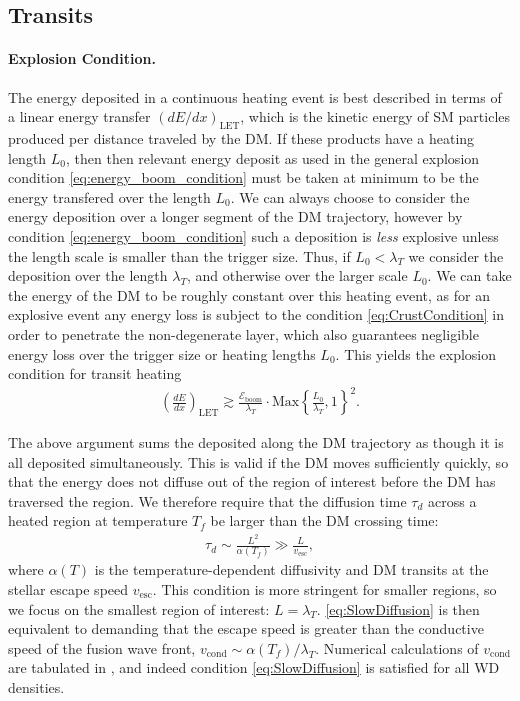 \documentclass[twocolumn, preprintnumbers,amsmath,amssymb,prd, superscriptaddress]{revtex4}
\newcommand{\Eboom}{\mathcal{E}_\text{boom}}
\begin{document}
\subsection{Transits}

\paragraph{Explosion Condition.}
The energy deposited in a continuous heating event is best described in terms of a linear energy transfer $(dE/dx)_\text{LET}$, which is the kinetic energy of SM particles produced per distance traveled by the DM.
If these products have a heating length $L_0$, then then relevant energy deposit as used in the general explosion condition \eqref{eq:energy_boom_condition} must be taken at minimum to be the energy transfered over the length $L_0$.
We can always choose to consider the energy deposition over a longer segment of the DM trajectory, however by condition \eqref{eq:energy_boom_condition} such a deposition is \emph{less} explosive unless the length scale is smaller than the trigger size.
Thus, if $L_0 < \lambda_T$ we consider the deposition over the length $\lambda_T$, and otherwise over the larger scale $L_0$.
We can take the energy of the DM to be roughly constant over this heating event, as for an explosive event any energy loss is subject to the condition
\eqref{eq:CrustCondition} in order to penetrate the non-degenerate layer, which also guarantees negligible energy loss over the trigger size or heating lengths $L_0$.
This yields the explosion condition for transit heating
\begin{align}
\label{eq:transitexplosion}
  \left( \frac{d E}{d x} \right)_\text{LET} \gtrsim
  \frac{\Eboom}{\lambda_T} \cdot \text{Max}
  \left\{\frac{L_0}{\lambda_T}, 1 \right\}^2.
\end{align}

The above argument sums the deposited along the DM trajectory as though it is all deposited simultaneously.
This is valid if the DM moves sufficiently quickly, so that the energy does not diffuse out of the region of interest before the DM has traversed the region.
We therefore require that the diffusion time $\tau_d$ across a heated region at temperature $T_f$ be larger than the DM crossing time:
\begin{align}
  \tau_d \sim \frac{L^2}{\alpha(T_f)} \gg
  \frac{L}{v_\text{esc}},
\label{eq:SlowDiffusion}
\end{align}
where $\alpha(T)$ is the temperature-dependent diffusivity and DM transits at the stellar escape speed $v_\text{esc}$.
This condition is more stringent for smaller regions, so we focus on the smallest region of interest: $L = \lambda_T$.
\eqref{eq:SlowDiffusion} is then equivalent to demanding that the escape speed is greater than the conductive speed of the fusion wave front, $v_\text{cond} \sim \alpha(T_f) / \lambda_T$.
Numerical calculations of $v_\text{cond}$ are tabulated in \cite{Woosley}, and indeed condition \eqref{eq:SlowDiffusion} is satisfied for all WD densities.
\end{document}

